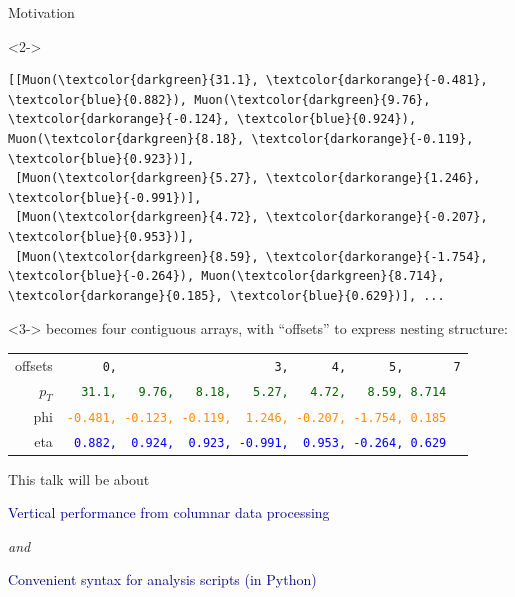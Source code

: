 \documentclass[aspectratio=169]{beamer}
\begin{document}
\begin{frame}[fragile]{Motivation}
\vspace{0.25 cm}
\begin{uncoverenv}<2->
\scriptsize
\begin{Verbatim}[commandchars=\\\{\}]
[[Muon(\textcolor{darkgreen}{31.1}, \textcolor{darkorange}{-0.481}, \textcolor{blue}{0.882}), Muon(\textcolor{darkgreen}{9.76}, \textcolor{darkorange}{-0.124}, \textcolor{blue}{0.924}), Muon(\textcolor{darkgreen}{8.18}, \textcolor{darkorange}{-0.119}, \textcolor{blue}{0.923})],
 [Muon(\textcolor{darkgreen}{5.27}, \textcolor{darkorange}{1.246}, \textcolor{blue}{-0.991})],
 [Muon(\textcolor{darkgreen}{4.72}, \textcolor{darkorange}{-0.207}, \textcolor{blue}{0.953})],
 [Muon(\textcolor{darkgreen}{8.59}, \textcolor{darkorange}{-1.754}, \textcolor{blue}{-0.264}), Muon(\textcolor{darkgreen}{8.714}, \textcolor{darkorange}{0.185}, \textcolor{blue}{0.629})], ...
\end{Verbatim}
\end{uncoverenv}

\vspace{0.25 cm}
\begin{uncoverenv}<3->
\scriptsize
{\normalsize becomes four contiguous arrays, with ``offsets'' to express nesting structure:}

\vspace{0.25 cm}
\begin{tabular}{r l}
\small offsets &                    {\tt\scriptsize \ \ \ \ \ 0,\ \ \ \ \ \ \ \ \ \ \ \ \ \ \ \ \ \ \ \ \ \ 3,\ \ \ \ \ \ 4,\ \ \ \ \ \ 5,\ \ \ \ \ \ \ 7} \\
\small $p_T$ & \textcolor{darkgreen}{\tt\scriptsize \ \ 31.1,\ \ \ 9.76,\ \ \ 8.18,\ \ \ 5.27,\ \ \ 4.72,\ \ \ 8.59, 8.714} \\
\small phi &  \textcolor{darkorange}{\tt\scriptsize -0.481,\ -0.123,\ -0.119,\ \ 1.246,\ -0.207,\ -1.754,\ 0.185} \\
\small eta &        \textcolor{blue}{\tt\scriptsize \ 0.882,\ \ 0.924,\ \ 0.923,\ -0.991,\ \ 0.953,\ -0.264,\ 0.629} \\
\end{tabular}
\end{uncoverenv}
\end{frame}

\begin{frame}{This talk will be about}
\vspace{0.5 cm}
\Large
\begin{center}
\textcolor{darkblue}{Vertical performance from columnar data processing}

\vspace{0.5 cm}
{\it and}

\vspace{0.5 cm}
\textcolor{darkblue}{Convenient syntax for analysis scripts (in Python)}
\end{center}
\end{frame}
\end{document}
